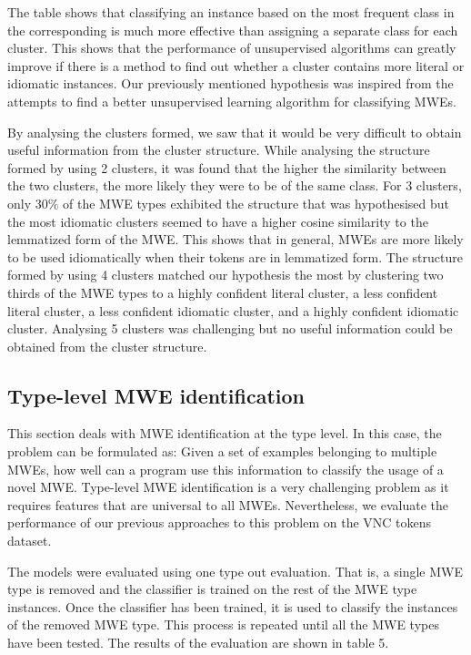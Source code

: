 \documentclass[11pt]{article}
\begin{document}
The table shows that classifying an instance based on the most frequent class in the corresponding is much more effective than assigning a separate class for each cluster. This shows that the performance of unsupervised algorithms can greatly improve if there is a method to find out whether a cluster contains more literal or idiomatic instances. Our previously mentioned hypothesis was inspired from the attempts to find a better unsupervised learning algorithm for classifying MWEs. 

By analysing the clusters formed, we saw that it would be very difficult to obtain useful information from the cluster structure. While analysing the structure formed by using 2 clusters, it was found that the higher the similarity between the two clusters, the more likely they were to be of the same class. For 3 clusters, only 30\% of the MWE types exhibited the structure that was hypothesised but the most idiomatic clusters seemed to have a higher cosine similarity to the lemmatized form of the MWE. This shows that in general, MWEs are more likely to be used idiomatically when their tokens are in lemmatized form. The structure formed by using 4 clusters matched our hypothesis the most by clustering two thirds of the MWE types to a highly confident literal cluster, a less confident literal cluster, a less confident idiomatic cluster, and a highly confident idiomatic cluster. Analysing 5 clusters was challenging but no useful information could be obtained from the cluster structure.  

\subsection{Type-level MWE identification}

This section deals with MWE identification at the type level. In this case, the problem can be formulated as: Given a set of examples belonging to multiple MWEs, how well can a program use this information to classify the usage of a novel MWE. Type-level MWE identification is a very challenging problem as it requires features that are universal to all MWEs. Nevertheless, we evaluate the performance of our previous approaches to this problem on the VNC tokens dataset. 


The models were evaluated using one type out evaluation. That is, a single MWE type is removed and the classifier is trained on the rest of the MWE type instances. Once the classifier has been trained, it is used to classify the instances of the removed MWE type. This process is repeated until all the MWE types have been tested. The results of the evaluation are shown in table 5. 
\end{document}
